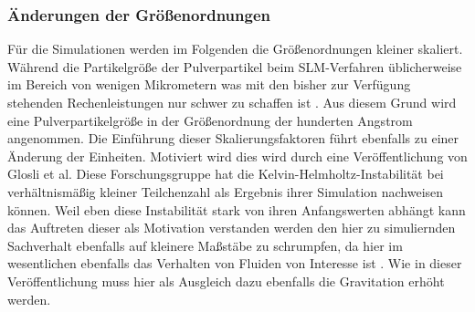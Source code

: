 		\subsubsection{Änderungen der Größenordnungen}
		Für die Simulationen werden im Folgenden die Größenordnungen kleiner skaliert. Während die
		Partikelgröße der Pulverpartikel beim SLM-Verfahren üblicherweise im Bereich von wenigen
		Mikrometern \cite{hajnys2020research} was mit den bisher zur Verfügung stehenden
		Rechenleistungen nur schwer zu schaffen ist \cite{eckhardt2013scientists}. Aus diesem
		Grund wird eine Pulverpartikelgröße in der Größenordnung der hunderten Angstrom
		angenommen. Die Einführung dieser Skalierungsfaktoren führt ebenfalls zu einer Änderung
		der Einheiten. Motiviert wird dies wird durch eine Veröffentlichung von Glosli et al.
		Diese Forschungsgruppe hat die Kelvin-Helmholtz-Instabilität bei verhältnismäßig kleiner
		Teilchenzahl als Ergebnis ihrer Simulation nachweisen können. Weil eben diese Instabilität
		stark von ihren Anfangswerten abhängt kann das Auftreten dieser als Motivation verstanden
		werden den hier zu simuliernden Sachverhalt ebenfalls auf kleinere Maßstäbe zu schrumpfen,
		da hier im wesentlichen ebenfalls das Verhalten von Fluiden von Interesse ist
		\cite{glosli2007extending}. Wie in dieser Veröffentlichung muss hier als Ausgleich dazu
		ebenfalls die Gravitation erhöht werden.

